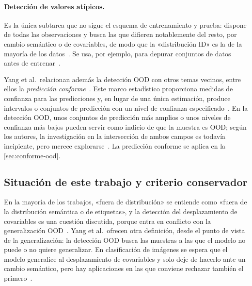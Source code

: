 \paragraph{Detección de valores atípicos.} Es la única subtarea que no sigue el
esquema de entrenamiento y prueba: dispone de todas las observaciones y busca las
que difieren notablemente del resto, por cambio semántico o de covariables, de
modo que la «distribución ID» es la de la mayoría de los datos~\cite{yang2024}. Se
usa, por ejemplo, para depurar conjuntos de datos antes de
entrenar~\cite{yang2024}.

Yang et al.\ relacionan además la detección OOD con otros temas vecinos, entre
ellos la \emph{predicción conforme}~\cite{yang2024}. Este marco estadístico
proporciona medidas de confianza para las predicciones y, en lugar de una única
estimación, produce intervalos o conjuntos de predicción con un nivel de confianza
especificado~\cite{yang2024,shafer2008,angelopoulos2021}. En la detección OOD,
unos conjuntos de predicción más amplios o unos niveles de confianza más bajos
pueden servir como indicio de que la muestra es OOD; según los autores, la
investigación en la intersección de ambos campos es todavía incipiente, pero
merece explorarse~\cite{yang2024}. La predicción conforme se aplica en la
\cref{sec:conforme-ood}.

\subsection{Situación de este trabajo y criterio conservador}\label{sec:ea-conservador}

En la mayoría de los trabajos, «fuera de distribución» se entiende como «fuera de
la distribución semántica o de etiquetas», y la detección del desplazamiento de
covariables es una cuestión discutida, porque entra en conflicto con la
generalización OOD~\cite{yang2024}. Yang et al.\ ofrecen otra definición, desde
el punto de vista de la generalización: la detección OOD busca las muestras a las
que el modelo no puede o no quiere generalizar. En clasificación de imágenes se
espera que el modelo generalice al desplazamiento de covariables y solo deje de
hacerlo ante un cambio semántico, pero hay aplicaciones en las que conviene
rechazar también el primero~\cite{yang2024}.

